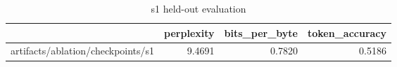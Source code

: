 \begin{table}[t]
\centering
\begin{tabular}{lrrr}
\toprule
 & perplexity & bits\_per\_byte & token\_accuracy \\
\midrule
artifacts/ablation/checkpoints/s1 & 9.4691 & 0.7820 & 0.5186 \\
\bottomrule
\end{tabular}
\caption{s1 held-out evaluation}
\label{tab:s1-eval}
\end{table}
